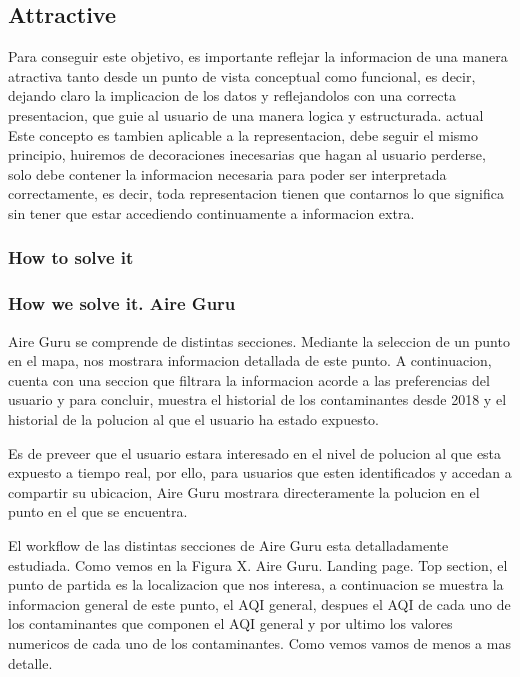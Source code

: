 \subsection{Attractive}
Para conseguir este objetivo, es importante reflejar la informacion de una manera atractiva tanto desde un punto de vista conceptual como funcional, 
es decir, dejando claro la implicacion de los datos y reflejandolos con una correcta presentacion, que guie al usuario de una manera logica y estructurada.
actual
Este concepto es tambien aplicable a la representacion, debe seguir el mismo principio, huiremos de decoraciones inecesarias que hagan al 
usuario perderse, solo debe contener la informacion necesaria para poder ser interpretada correctamente, es decir,
toda representacion tienen que contarnos lo que significa sin tener que estar accediendo continuamente a informacion
extra.

\subsubsection{How to solve it} 


\subsubsection{How we solve it. Aire Guru} 
Aire Guru se comprende de distintas secciones. Mediante la seleccion de un punto en el mapa, nos
mostrara informacion detallada de este punto. A continuacion, cuenta con una seccion que filtrara la informacion acorde a las preferencias del usuario
y para concluir, muestra el historial de los contaminantes desde 2018 y el historial de la polucion al que el usuario ha estado
expuesto.

Es de preveer que el usuario estara interesado en el nivel de polucion al que esta expuesto a tiempo real, por ello, para usuarios
que esten identificados y accedan a compartir su ubicacion, Aire Guru mostrara directeramente la polucion en el punto en el 
que se encuentra.

El workflow de las distintas secciones de Aire Guru esta detalladamente estudiada. Como vemos en la Figura X. Aire Guru. Landing page. Top section, el punto de partida es la localizacion que nos interesa,
a continuacion se muestra la informacion general de este punto, el AQI general, despues el AQI de cada uno de los contaminantes que componen el 
AQI general y por ultimo los valores numericos de cada uno de los contaminantes. Como vemos vamos de menos a mas detalle.
\begin{itemize}
    \done
    \crossed
    
\end{itemize}
\newpage